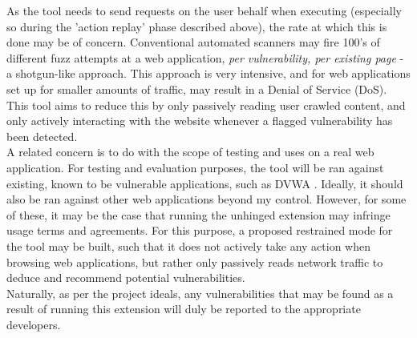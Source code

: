 As the tool needs to send requests on the user behalf when executing (especially so during the 'action replay' phase described above), the rate at which this is done may be of concern. Conventional automated scanners may fire 100's of different fuzz attempts at a web application, \emph{per vulnerability, per existing page} - a shotgun-like approach. This approach is very intensive, and for web applications set up for smaller amounts of traffic, may result in a Denial of Service (DoS). This tool aims to reduce this by only passively reading user crawled content, and only actively interacting with the website whenever a flagged vulnerability has been detected. \\

A related concern is to do with the scope of testing and uses on a real web application. For testing and evaluation purposes, the tool will be ran against existing, known to be vulnerable applications, such as DVWA \cite{dvwaSite}. Ideally, it should also be ran against other web applications beyond my control. However, for some of these, it may be the case that running the unhinged extension may infringe usage terms and agreements. For this purpose, a proposed restrained mode for the tool may be built, such that it does not actively take any action when browsing web applications, but rather only passively reads network traffic to deduce and recommend potential vulnerabilities. \\

Naturally, as per the project ideals, any vulnerabilities that may be found as a result of running this extension will duly be reported to the appropriate developers.